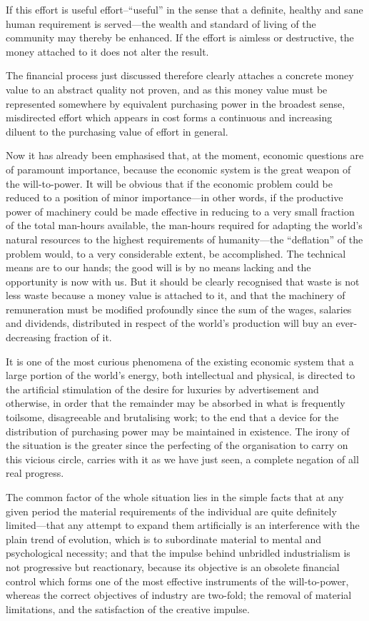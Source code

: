 \documentclass{book}
\begin{document}
If this effort is useful effort–“useful” in the sense that a definite, healthy and sane human requirement is served—the wealth and standard of living of the community may thereby be enhanced. If the effort is aimless or destructive, the money attached to it does not alter the result.

The financial process just discussed therefore clearly attaches a concrete money value to an abstract quality not proven, and as this money value must be represented somewhere by equivalent purchasing power in the broadest sense, misdirected effort which appears in cost forms a continuous and increasing diluent to the purchasing value of effort in general.

Now it has already been emphasised that, at the moment, economic questions are of paramount importance, because the economic system is the great weapon of the will-to-power. It will be obvious that if the economic problem could be reduced to a position of minor importance—in other words, if the productive power of machinery could be made effective in reducing to a very small fraction of the total man-hours available, the man-hours required for adapting the world’s natural resources to the highest requirements of humanity—the “deflation” of the problem would, to a very considerable extent, be accomplished. The technical means are to our hands; the good will is by no means lacking and the opportunity is now with us. But it should be clearly recognised that waste is not less waste because a money value is attached to it, and that the machinery of remuneration must be modified profoundly since the sum of the wages, salaries and dividends, distributed in respect of the world’s production will buy an ever-decreasing fraction of it.

It is one of the most curious phenomena of the existing economic system that a large portion of the world’s energy, both intellectual and physical, is directed to the artificial stimulation of the desire for luxuries by advertisement and otherwise, in order that the remainder may be absorbed in what is frequently toilsome, disagreeable and brutalising work; to the end that a device for the distribution of purchasing power may be maintained in existence. The irony of the situation is the greater since the perfecting of the organisation to carry on this vicious circle, carries with it as we have just seen, a complete negation of all real progress.

The common factor of the whole situation lies in the simple facts that at any given period the material requirements of the individual are quite definitely limited—that any attempt to expand them artificially is an interference with the plain trend of evolution, which is to subordinate material to mental and psychological necessity; and that the impulse behind unbridled industrialism is not progressive but reactionary, because its objective is an obsolete financial control which forms one of the most effective instruments of the will-to-power, whereas the correct objectives of industry are two-fold; the removal of material limitations, and the satisfaction of the creative impulse.
\end{document}
